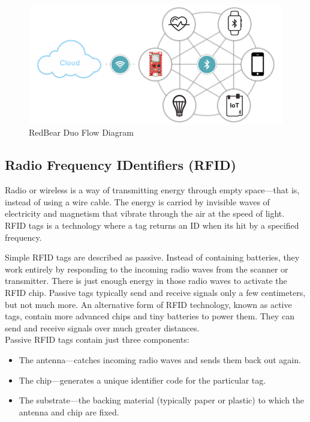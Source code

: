 \documentclass[12pt]{article}
\begin{document}
\begin{figure}[!htb]
  \includegraphics[width=\textwidth]{Figures/RedBearDuoCloud.png}
  \caption{RedBear Duo Flow Diagram}
  \label{fig:RedBearDuoFlowDiagram}
\end{figure}

\subsection{Radio Frequency IDentifiers (RFID)}

Radio or wireless is a way of transmitting energy through empty space—that is, instead of using a wire cable. The energy is carried by invisible waves of electricity and magnetism that vibrate through the air at the speed of light. RFID tags is a technology where a tag returns an ID when its hit by a specified frequency.

Simple RFID tags are described as passive. Instead of containing batteries, they work entirely by responding to the incoming radio waves from the scanner or transmitter. There is just enough energy in those radio waves to activate the RFID chip. Passive tags typically send and receive signals only a few centimeters, but not much more. An alternative form of RFID technology, known as active tags, contain more advanced chips and tiny batteries to power them. They can send and receive signals over much greater distances\cite{Stuff}.\\

Passive RFID tags contain just three components:
\begin{itemize}
    \item The antenna—catches incoming radio waves and sends them back out again.
    \item The chip—generates a unique identifier code for the particular tag.
    \item The substrate—the backing material (typically paper or plastic) to which the antenna and chip are fixed.
\end{itemize}
\end{document}
